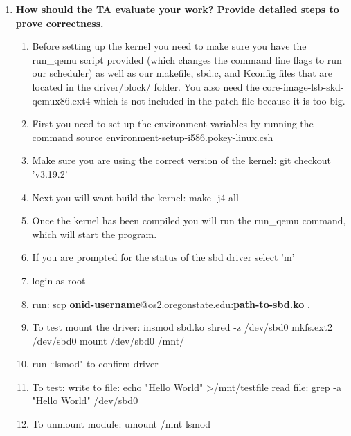 \documentclass[onecolumn, draftclsnofoot,10pt, compsoc]{IEEEtran}
\begin{document}
\begin{enumerate}
\item \textbf{How should the TA evaluate your work? Provide detailed steps to prove correctness.} 	\begin{enumerate}
	\item Before setting up the kernel you need to make sure you have the run\_qemu script provided (which changes the command line flags to run our scheduler) as well as our makefile, sbd.c, and Kconfig files that are located in the driver/block/ folder. You also need the core-image-lsb-skd-qemux86.ext4 which is not included in the patch file because it is too big.
    
	\item First you need to set up the environment variables by running the command source environment-setup-i586.pokey-linux.csh
    
    \item Make sure you are using the correct version of the kernel: git checkout 'v3.19.2'
    \item Next you will want build the kernel: make -j4 all
    \item Once the kernel has been compiled you will run the run\_qemu command, which will start the program.
    \item If you are prompted for the status of the sbd driver select 'm'
    \item login as root
    \item run: scp \textbf{onid-username}@os2.oregonstate.edu:\textbf{path-to-sbd.ko} .
    
    \item To test mount the driver:
    \subitem insmod sbd.ko
    \subitem shred -z /dev/sbd0
    \subitem mkfs.ext2 /dev/sbd0
    \subitem mount /dev/sbd0 /mnt/
    \item run ``lsmod" to confirm driver
    
    \item To test:
    \subitem write to file: echo "Hello World" \textgreater  /mnt/testfile
    \subitem read file: grep -a "Hello World"  /dev/sbd0 
    
    \item To unmount module:
    \subitem umount /mnt
    \subitem lsmod 
	\end{enumerate}
\end{enumerate}
\end{document}
